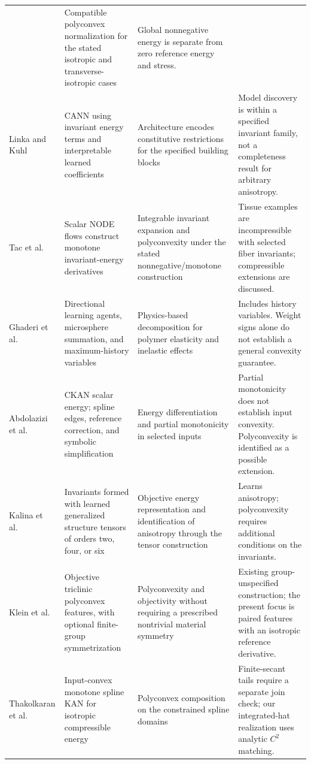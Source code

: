 \begin{longtable}{@{}>{\raggedright\arraybackslash}p{2.6cm}>{\raggedright\arraybackslash}p{4.05cm}>{\raggedright\arraybackslash}p{4.15cm}>{\raggedright\arraybackslash}p{4.85cm}@{}}
& Compatible polyconvex normalization for the stated isotropic and transverse-isotropic cases
& Global nonnegative energy is separate from zero reference energy and stress.\\
\addlinespace
Linka and Kuhl~\cite{Linka2023}
& CANN using invariant energy terms and interpretable learned coefficients
& Architecture encodes constitutive restrictions for the specified building blocks
& Model discovery is within a specified invariant family, not a completeness result for arbitrary anisotropy.\\
\addlinespace
Tac et al.~\cite{Tac2022}
& Scalar NODE flows construct monotone invariant-energy derivatives
& Integrable invariant expansion and polyconvexity under the stated nonnegative/monotone construction
& Tissue examples are incompressible with selected fiber invariants; compressible extensions are discussed.\\
\addlinespace
Ghaderi et al.~\cite{Ghaderi2020}
& Directional learning agents, microsphere summation, and maximum-history variables
& Physics-based decomposition for polymer elasticity and inelastic effects
& Includes history variables. Weight signs alone do not establish a general convexity guarantee.\\
\addlinespace
Abdolazizi et al.~\cite{Abdolazizi2025}
& CKAN scalar energy; spline edges, reference correction, and symbolic simplification
& Energy differentiation and partial monotonicity in selected inputs
& Partial monotonicity does not establish input convexity. Polyconvexity is identified as a possible extension.\\
\addlinespace
Kalina et al.~\cite{Kalina2024}
& Invariants formed with learned generalized structure tensors of orders two, four, or six
& Objective energy representation and identification of anisotropy through the tensor construction
& Learns anisotropy; polyconvexity requires additional conditions on the invariants.\\
\addlinespace
Klein et al.~\cite{klein2026}
& Objective triclinic polyconvex features, with optional finite-group symmetrization
& Polyconvexity and objectivity without requiring a prescribed nontrivial material symmetry
& Existing group-unspecified construction; the present focus is paired features with an isotropic reference derivative.\\
\addlinespace
Thakolkaran et al.~\cite{thakolkaran2025}
& Input-convex monotone spline KAN for isotropic compressible energy
& Polyconvex composition on the constrained spline domains
& Finite-secant tails require a separate join check; our integrated-hat realization uses analytic $C^2$ matching.\\

\end{longtable}
